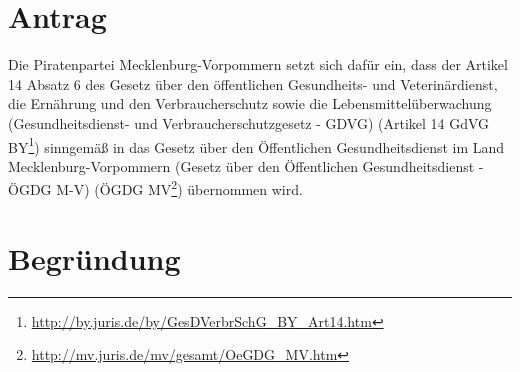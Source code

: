 \section{Antrag}

Die Piratenpartei Mecklenburg-Vorpommern setzt sich dafür ein, dass der Artikel 14 Absatz 6 des Gesetz über den öffentlichen Gesundheits- und Veterinärdienst, die Ernährung und den Verbraucherschutz sowie die Lebensmittelüberwachung (Gesundheitsdienst- und Verbraucherschutzgesetz - GDVG) (Artikel 14 GdVG BY\footnote{\url{http://by.juris.de/by/GesDVerbrSchG\_BY\_Art14.htm}}) sinngemäß in das Gesetz über den Öffentlichen Gesundheitsdienst im Land Mecklenburg-Vorpommern (Gesetz über den Öffentlichen Gesundheitsdienst - ÖGDG M-V) (ÖGDG MV\footnote{\url{http://mv.juris.de/mv/gesamt/OeGDG\_MV.htm}}) übernommen wird.

\section{Begründung}


